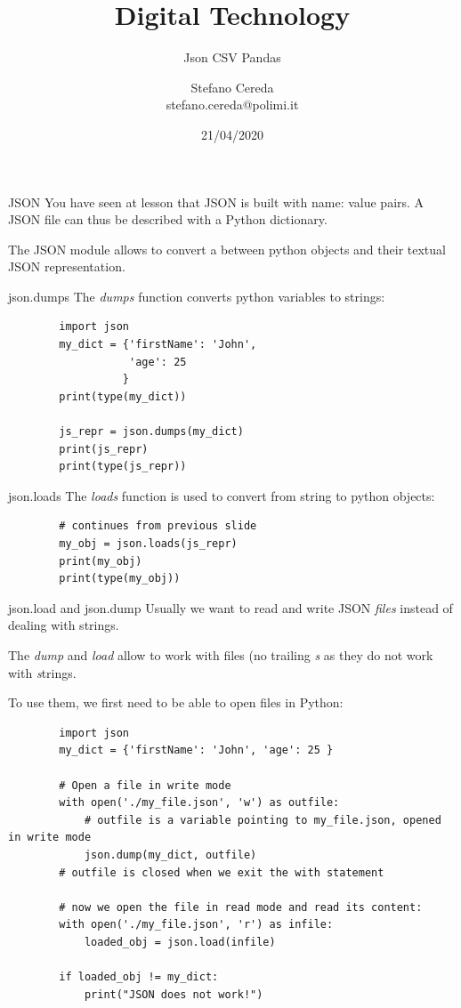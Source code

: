 \documentclass[aspectratio=169,handout]{beamer}
\title{Digital Technology}
\subtitle{Json CSV Pandas}
\author{Stefano Cereda\\
stefano.cereda@polimi.it
}
\date{21/04/2020}
\institute[PoliMi]{Politecnico Milano}
\begin{document}
\begin{frame}
    \maketitle
\end{frame}

\begin{frame}{JSON}
    You have seen at lesson that JSON is built with name: value pairs.
    A JSON file can thus be described with a Python dictionary.

    The JSON module allows to convert a between python objects and their textual JSON representation.
\end{frame}

\begin{frame}[fragile]{json.dumps}
    The \emph{dumps} function converts python variables to strings:
    \begin{verbatim}
        import json
        my_dict = {'firstName': 'John',
                   'age': 25
                  }
        print(type(my_dict))

        js_repr = json.dumps(my_dict)
        print(js_repr)
        print(type(js_repr))
    \end{verbatim}
\end{frame}

\begin{frame}[fragile]{json.loads}
    The \emph{loads} function is used to convert from string to python objects:
    \begin{verbatim}
        # continues from previous slide
        my_obj = json.loads(js_repr)
        print(my_obj)
        print(type(my_obj))
    \end{verbatim}
\end{frame}


\begin{frame}[fragile]{json.load and json.dump}
    Usually we want to read and write JSON \emph{files} instead of dealing with strings.

    The \emph{dump} and \emph{load} allow to work with files (no trailing \emph{s} as they do not work with
    \emph{s}trings.

    To use them, we first need to be able to open files in Python:
    \begin{verbatim}
        import json
        my_dict = {'firstName': 'John', 'age': 25 }

        # Open a file in write mode
        with open('./my_file.json', 'w') as outfile:
            # outfile is a variable pointing to my_file.json, opened in write mode
            json.dump(my_dict, outfile)
        # outfile is closed when we exit the with statement

        # now we open the file in read mode and read its content:
        with open('./my_file.json', 'r') as infile:
            loaded_obj = json.load(infile)

        if loaded_obj != my_dict:
            print("JSON does not work!")
    \end{verbatim}
\end{frame}
\end{document}
